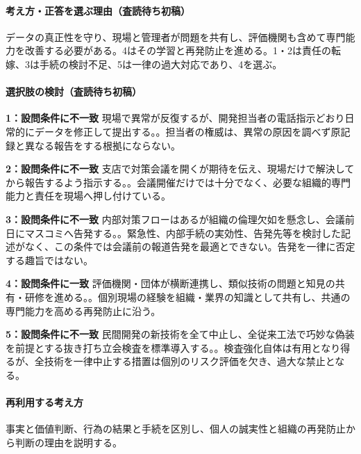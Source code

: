 \paragraph{考え方・正答を選ぶ理由（査読待ち初稿）} データの真正性を守り、現場と管理者が問題を共有し、評価機関も含めて専門能力を改善する必要がある。4はその学習と再発防止を進める。1・2は責任の転嫁、3は手続の検討不足、5は一律の過大対応であり、4を選ぶ。

\paragraph{選択肢の検討（査読待ち初稿）}\mbox{}\par

\noindent\textbf{1：設問条件に不一致} 現場で異常が反復するが、開発担当者の電話指示どおり日常的にデータを修正して提出する。。担当者の権威は、異常の原因を調べず原記録と異なる報告をする根拠にならない。\par

\noindent\textbf{2：設問条件に不一致} 支店で対策会議を開くが期待を伝え、現場だけで解決してから報告するよう指示する。。会議開催だけでは十分でなく、必要な組織的専門能力と責任を現場へ押し付けている。\par

\noindent\textbf{3：設問条件に不一致} 内部対策フローはあるが組織の倫理欠如を懸念し、会議前日にマスコミへ告発する。。緊急性、内部手続の実効性、告発先等を検討した記述がなく、この条件では会議前の報道告発を最適とできない。告発を一律に否定する趣旨ではない。\par

\noindent\textbf{4：設問条件に一致} 評価機関・団体が横断連携し、類似技術の問題と知見の共有・研修を進める。。個別現場の経験を組織・業界の知識として共有し、共通の専門能力を高める再発防止に沿う。\par

\noindent\textbf{5：設問条件に不一致} 民間開発の新技術を全て中止し、全従来工法で巧妙な偽装を前提とする抜き打ち立会検査を標準導入する。。検査強化自体は有用となり得るが、全技術を一律中止する措置は個別のリスク評価を欠き、過大な禁止となる。\par

\paragraph{再利用する考え方} 事実と価値判断、行為の結果と手続を区別し、個人の誠実性と組織の再発防止から判断の理由を説明する。

